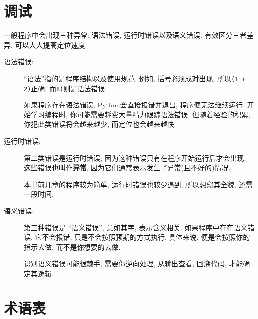 \documentclass[10pt]{book}
\begin{document}
\section{调试}

一般程序中会出现三种异常:
语法错误, 运行时错误以及语义错误. 
有效区分三者差异, 可以大大提高定位速度. 

\begin{description}

\item[语法错误:] ``语法''指的是程序结构以及使用规范. 
例如, 括号必须成对出现, 
所以{\tt (1 + 2)}正确, 而{\tt 8)}则是语法错误. 

如果程序存在语法错误, Python会直接报错并退出, 
程序便无法继续运行. 
开始学习编程时, 你可能需要耗费大量精力跟踪语法错误. 
但随着经验的积累, 你犯此类错误将会越来越少, 而定位也会越来越快.


\item[运行时错误:] 第二类错误是运行时错误, 
因为这种错误只有在程序开始运行后才会出现. 
这些错误也叫作{\bf 异常}, 
因为它们通常表示发生了异常(且不好的)情况. 
 
    

本书前几章的程序较为简单, 运行时错误也较少遇到, 
所以想窥其全貌, 还需一段时间. 

\item[语义错误:] 第三种错误是 ``语义错误'', 
意如其字, 表示含义相关. 
如果程序中存在语义错误, 它不会报错, 只是不会按照预期的方式执行. 
具体来说, 便是会按照你的指示去做, 而不是你想要的去做.
   

识别语义错误可能很棘手, 需要你逆向处理, 
从输出查看, 回溯代码, 才能确定其逻辑. 

\end{description}


\section{术语表}
\end{document}
